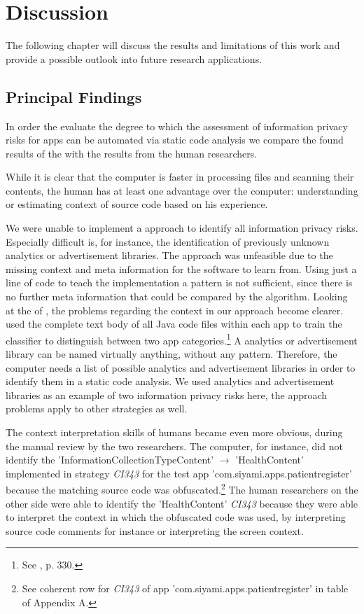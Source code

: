 \section{Discussion}

The following chapter will discuss the results and limitations of this work and provide a possible outlook into future research applications.

\subsection{Principal Findings}

In order the evaluate the degree to which the assessment of information privacy risks for \mH apps can be automated via static code analysis we compare the \ipr found results of the \aiprat with the results from the human researchers.

While it is clear that the computer is faster in processing files and scanning their contents, the human has at least one advantage over the computer: understanding or estimating context of source code based on his experience.

We were unable to implement a \ml approach to identify all information privacy risks.
Especially difficult is, for instance, the identification of previously unknown analytics or advertisement libraries.
The \ml approach was unfeasible due to the missing context and meta information for the software to learn from.
Using just a line of code to teach the \ml implementation a pattern is not sufficient, since there is no further meta information that could be compared by the algorithm.
Looking at the \ml of \textcite{Shabtai2010}, the problems regarding the context in our approach become clearer.
\textcite{Shabtai2010} used the complete text body of all Java code files within each app to train the \ml classifier to distinguish between two app categories.\footnote{See \cite{Shabtai2010}, p. 330.}
A analytics or advertisement library can be named virtually anything, without any pattern.
Therefore, the computer needs a list of possible analytics and advertisement libraries in order to identify them in a static code analysis.
We used analytics and advertisement libraries as an example of two information privacy risks here, the \ml approach problems apply to other \ipr strategies as well.

The context interpretation skills of humans became even more obvious, during the manual review by the two researchers.
The computer, for instance, did not identify the \ipr 'InformationCollectionTypeContent' $\rightarrow$ 'HealthContent' implemented in strategy \textit{CI343} for the test app 'com.siyami.apps.patientregister' because the matching source code was obfuscated.\footnote{See coherent row for \textit{CI343} of app 'com.siyami.apps.patientregister'  in table of Appendix A.}
The human researchers on the other side were able to identify the 'HealthContent' \textit{CI343} \ipr because they were able to interpret the context in which the obfuscated code was used, by interpreting source code comments for instance or interpreting the screen context.

